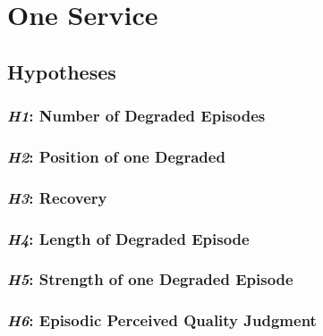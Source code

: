 \section{One Service}


\subsection{Hypotheses}

\subsubsection*{\emph{H1}: Number of Degraded Episodes}

\subsubsection*{\emph{H2}: Position of one Degraded}

\subsubsection*{\emph{H3}: Recovery}

\subsubsection*{\emph{H4}: Length of Degraded Episode}

\subsubsection*{\emph{H5}: Strength of one Degraded Episode}

\subsubsection*{\emph{H6}: Episodic Perceived Quality Judgment }

